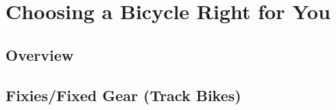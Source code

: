 \chapter{Choosing a Bicycle Right for You}

\section{Overview}



\section{Fixies/Fixed Gear (Track Bikes)}


